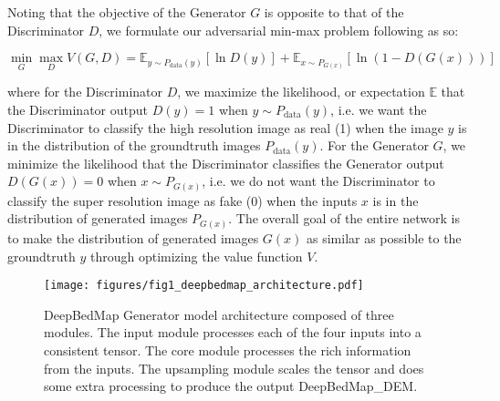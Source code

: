 \documentclass[tc, manuscript]{copernicus}
\begin{document}
Noting that the objective of the Generator $G$ is opposite to that of the Discriminator $D$, we formulate our adversarial min-max problem following \citet{GoodfellowGenerativeAdversarialNetworks2014} as so:

\begin{equation}\label{eq:4}
  \min_{G} \max_{D} V(G,D) = \mathbb{E}_{y \sim P_{\text{data}}(y)}[\ln D(y)] + \mathbb{E}_{x \sim P_{G(x)}}[\ln(1-D(G(x)))]
\end{equation}

where for the Discriminator $D$, we maximize the likelihood, or expectation $\mathbb{E}$ that the Discriminator output $D(y)=1$ when $y \sim P_{\text{data}}(y)$, i.e. we want the Discriminator to classify the high resolution image as real (1) when the image $y$ is in the distribution of the groundtruth images $P_{\text{data}}(y)$.
For the Generator $G$, we minimize the likelihood that the Discriminator classifies the Generator output $D(G(x))=0$ when $x \sim P_{G(x)}$, i.e. we do not want the Discriminator to classify the super resolution image as fake (0) when the inputs $x$ is in the distribution of generated images $P_{G(x)}$.
The overall goal of the entire network is to make the distribution of generated images $G(x)$ as similar as possible to the groundtruth $y$ through optimizing the value function $V$.

\begin{figure*}[htbp]
  \texttt{[image: figures/fig1\_deepbedmap\_architecture.pdf]}
  \caption{
    DeepBedMap Generator model architecture composed of three modules.
    The input module processes each of the four inputs into a consistent tensor.
    The core module processes the rich information from the inputs.
    The upsampling module scales the tensor and does some extra processing to produce the output DeepBedMap\_DEM.
  }
  \label{fig:1}
\end{figure*}
\end{document}
